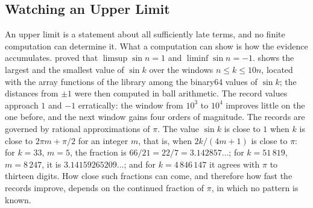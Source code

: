 \subsection{Watching an Upper Limit}

An upper limit is a statement about all sufficiently late terms, and no finite computation can determine it. What a computation can show is how the evidence accumulates.  proved that $\limsup\sin n=1$ and $\liminf\sin n=-1$.  shows the largest and the smallest value of $\sin k$ over the windows $n\le k\le10n$, located with the array functions of the library among the binary64 values of $\sin k$; the distances from $\pm1$ were then computed in ball arithmetic. The record values approach $1$ and $-1$ erratically: the window from $10^3$ to $10^4$ improves little on the one before, and the next window gains four orders of magnitude. The records are governed by rational approximations of $\pi$. The value $\sin k$ is close to $1$ when $k$ is close to $2\pi m+\pi/2$ for an integer $m$, that is, when $2k/(4m+1)$ is close to $\pi$: for $k=33$, $m=5$, the fraction is $66/21=22/7=3.142857\ldots$; for $k=51\,819$, $m=8\,247$, it is $3.14159265209\ldots$; and for $k=4\,846\,147$ it agrees with $\pi$ to thirteen digits. How close such fractions can come, and therefore how fast the records improve, depends on the continued fraction of $\pi$, in which no pattern is known.

\begin{table}
\end{table}

